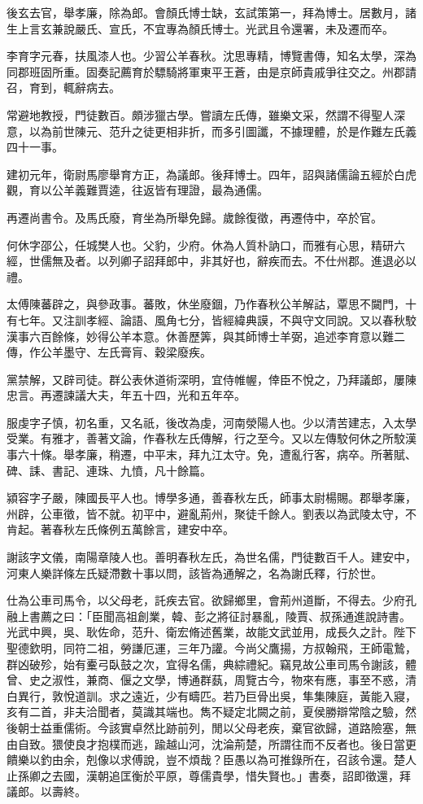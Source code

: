 \begin{pinyinscope}
後玄去官，舉孝廉，除為郎。會顏氏博士缺，玄試策第一，拜為博士。居數月，諸生上言玄兼說嚴氏、宣氏，不宜專為顏氏博士。光武且令還署，未及遷而卒。

李育字元春，扶風漆人也。少習公羊春秋。沈思專精，博覽書傳，知名太學，深為同郡班固所重。固奏記薦育於驃騎將軍東平王蒼，由是京師貴戚爭往交之。州郡請召，育到，輒辭病去。

常避地教授，門徒數百。頗涉獵古學。嘗讀左氏傳，雖樂文采，然謂不得聖人深意，以為前世陳元、范升之徒更相非折，而多引圖讖，不據理體，於是作難左氏義四十一事。

建初元年，衛尉馬廖舉育方正，為議郎。後拜博士。四年，詔與諸儒論五經於白虎觀，育以公羊義難賈逵，往返皆有理證，最為通儒。

再遷尚書令。及馬氏廢，育坐為所舉免歸。歲餘復徵，再遷侍中，卒於官。

何休字邵公，任城樊人也。父豹，少府。休為人質朴訥口，而雅有心思，精研六經，世儒無及者。以列卿子詔拜郎中，非其好也，辭疾而去。不仕州郡。進退必以禮。

太傅陳蕃辟之，與參政事。蕃敗，休坐廢錮，乃作春秋公羊解詁，覃思不闚門，十有七年。又注訓孝經、論語、風角七分，皆經緯典謨，不與守文同說。又以春秋駮漢事六百餘條，妙得公羊本意。休善歷筭，與其師博士羊弼，追述李育意以難二傳，作公羊墨守、左氏膏肓、穀梁廢疾。

黨禁解，又辟司徒。群公表休道術深明，宜侍帷幄，倖臣不悅之，乃拜議郎，屢陳忠言。再遷諫議大夫，年五十四，光和五年卒。

服虔字子慎，初名重，又名祇，後改為虔，河南滎陽人也。少以清苦建志，入太學受業。有雅才，善著文論，作春秋左氏傳解，行之至今。又以左傳駮何休之所駮漢事六十條。舉孝廉，稍遷，中平末，拜九江太守。免，遭亂行客，病卒。所著賦、碑、誄、書記、連珠、九憤，凡十餘篇。

潁容字子嚴，陳國長平人也。博學多通，善春秋左氏，師事太尉楊賜。郡舉孝廉，州辟，公車徵，皆不就。初平中，避亂荊州，聚徒千餘人。劉表以為武陵太守，不肯起。著春秋左氏條例五萬餘言，建安中卒。

謝該字文儀，南陽章陵人也。善明春秋左氏，為世名儒，門徒數百千人。建安中，河東人樂詳條左氏疑滯數十事以問，該皆為通解之，名為謝氏釋，行於世。

仕為公車司馬令，以父母老，託疾去官。欲歸鄉里，會荊州道斷，不得去。少府孔融上書薦之曰：「臣聞高祖創業，韓、彭之將征討暴亂，陵賈、叔孫通進說詩書。光武中興，吳、耿佐命，范升、衛宏脩述舊業，故能文武並用，成長久之計。陛下聖德欽明，同符二祖，勞謙厄運，三年乃讙。今尚父鷹揚，方叔翰飛，王師電鷙，群凶破殄，始有櫜弓臥鼓之次，宜得名儒，典綜禮紀。竊見故公車司馬令謝該，體曾、史之淑性，兼商、偃之文學，博通群蓺，周覽古今，物來有應，事至不惑，清白異行，敦悅道訓。求之遠近，少有疇匹。若乃巨骨出吳，隼集陳庭，黃能入寢，亥有二首，非夫洽聞者，莫識其端也。雋不疑定北闕之前，夏侯勝辯常陰之驗，然後朝士益重儒術。今該實卓然比跡前列，閒以父母老疾，棄官欲歸，道路險塞，無由自致。猥使良才抱樸而逃，踰越山河，沈淪荊楚，所謂往而不反者也。後日當更饋樂以釣由余，剋像以求傅說，豈不煩哉？臣愚以為可推錄所在，召該令還。楚人止孫卿之去國，漢朝追匡衡於平原，尊儒貴學，惜失賢也。」書奏，詔即徵還，拜議郎。以壽終。


\end{pinyinscope}
